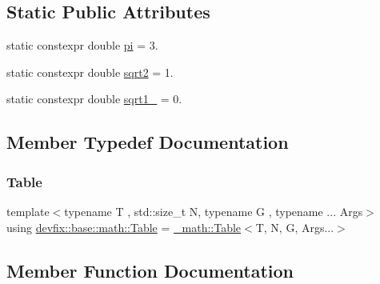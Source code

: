 \subsection*{Static Public Attributes}
\begin{DoxyCompactItemize}
\item 
static constexpr double \hyperlink{structdevfix_1_1base_1_1math_a8c1abe5113400c369f55d3e0bd12c25d}{pi} = 3.
\item 
static constexpr double \hyperlink{structdevfix_1_1base_1_1math_aa947bd4fd2f8ed24b477c01be61cb785}{sqrt2} = 1.
\item 
static constexpr double \hyperlink{structdevfix_1_1base_1_1math_af56711a6b6b8b6143993b13ca9e06b6e}{sqrt1\+\_} = 0.
\end{DoxyCompactItemize}


\subsection{Member Typedef Documentation}
\mbox{\label{structdevfix_1_1base_1_1math_a6f2114ac2cf825b518cf5fefa00af6e3}} 
\subsubsection{\texorpdfstring{Table}{Table}}
{\footnotesize\ttfamily template$<$typename T , std\+::size\+\_\+t N, typename G , typename ... Args$>$ \\
using \hyperlink{structdevfix_1_1base_1_1math_a6f2114ac2cf825b518cf5fefa00af6e3}{devfix\+::base\+::math\+::\+Table} =  \hyperlink{structdevfix_1_1base_1_1__math_1_1Table}{\+\_\+math\+::\+Table}$<$T, N, G, Args...$>$}



\subsection{Member Function Documentation}
\mbox{\label{structdevfix_1_1base_1_1math_a01f04c02cfad1ad74a133d85214bfdf0}} 
